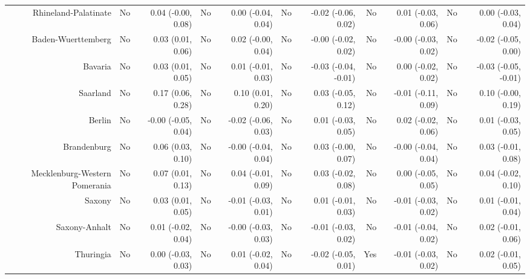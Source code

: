 \documentclass[
  man,floatsintext]{apa6}
\newenvironment{lltable}{\begin{landscape}\centering\begin{ThreePartTable}}{\end{ThreePartTable}\end{landscape}}
\begin{document}
\begin{lltable}
{\begin{longtable}{rrrrrrrrrrr}
Rhineland-Palatinate & No & 0.04 (-0.00, 0.08) & No & 0.00 (-0.04, 0.04) & No & -0.02 (-0.06, 0.02) & No & 0.01 (-0.03, 0.06) & No & 0.00 (-0.03, 0.04)\\
Baden-Wuerttemberg & No & 0.03 (0.01, 0.06) & No & 0.02 (-0.00, 0.04) & No & -0.00 (-0.02, 0.02) & No & -0.00 (-0.03, 0.02) & No & -0.02 (-0.05, 0.00)\\
Bavaria & No & 0.03 (0.01, 0.05) & No & 0.01 (-0.01, 0.03) & No & -0.03 (-0.04, -0.01) & No & 0.00 (-0.02, 0.02) & No & -0.03 (-0.05, -0.01)\\
Saarland & No & 0.17 (0.06, 0.28) & No & 0.10 (0.01, 0.20) & No & 0.03 (-0.05, 0.12) & No & -0.01 (-0.11, 0.09) & No & 0.10 (-0.00, 0.19)\\
Berlin & No & -0.00 (-0.05, 0.04) & No & -0.02 (-0.06, 0.03) & No & 0.01 (-0.03, 0.05) & No & 0.02 (-0.02, 0.06) & No & 0.01 (-0.03, 0.05)\\
Brandenburg & No & 0.06 (0.03, 0.10) & No & -0.00 (-0.04, 0.04) & No & 0.03 (-0.00, 0.07) & No & -0.00 (-0.04, 0.04) & No & 0.03 (-0.01, 0.08)\\
Mecklenburg-Western Pomerania & No & 0.07 (0.01, 0.13) & No & 0.04 (-0.01, 0.09) & No & 0.03 (-0.02, 0.08) & No & 0.00 (-0.05, 0.05) & No & 0.04 (-0.02, 0.10)\\
Saxony & No & 0.03 (0.01, 0.05) & No & -0.01 (-0.03, 0.01) & No & 0.01 (-0.01, 0.03) & No & -0.01 (-0.03, 0.02) & No & 0.01 (-0.01, 0.04)\\
Saxony-Anhalt & No & 0.01 (-0.02, 0.04) & No & -0.00 (-0.03, 0.03) & No & -0.01 (-0.03, 0.02) & No & -0.01 (-0.04, 0.02) & No & 0.02 (-0.01, 0.06)\\
Thuringia & No & 0.00 (-0.03, 0.03) & No & 0.01 (-0.02, 0.04) & No & -0.02 (-0.05, 0.01) & Yes & -0.01 (-0.03, 0.02) & No & 0.02 (-0.01, 0.05)\\
\bottomrule
\end{longtable}

}

\end{lltable}
\end{document}
